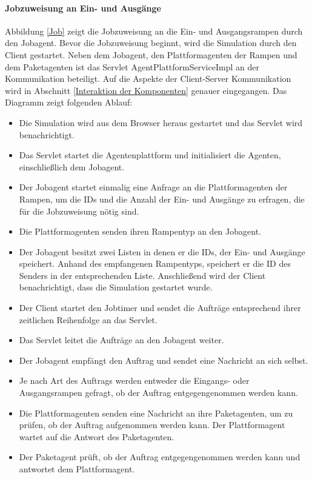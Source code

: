 \paragraph{Jobzuweisung an Ein- und Ausgänge} \label{Jobagent}
Abbildung \ref{Job} zeigt die Jobzuweisung an die Ein- und Ausgangsrampen durch den Jobagent. Bevor die Jobzuweisung beginnt, wird die Simulation durch den Client gestartet. Neben dem Jobagent, den Plattformagenten der Rampen und dem Paketagenten ist das Servlet AgentPlattformServiceImpl an der Kommunikation beteiligt. Auf die Aspekte der Client-Server Kommunikation wird in Abschnitt  \ref{Interaktion der Komponenten} genauer eingegangen. Das Diagramm zeigt folgenden Ablauf:
\begin{itemize}
\item Die Simulation wird aus dem Browser heraus gestartet und das Servlet wird benachrichtigt.
\item Das Servlet startet die Agentenplattform und initialisiert die Agenten, einschließlich dem Jobagent. 
\item Der Jobagent startet einmalig eine Anfrage an die Plattformagenten der Rampen, um die IDs und die Anzahl der Ein- und Ausgänge zu erfragen, die für die Jobzuweisung nötig sind. 
\item Die Plattformagenten senden ihren Rampentyp an den Jobagent.
\item Der Jobagent besitzt zwei Listen in denen er die IDs, der Ein- und Ausgänge speichert. Anhand des empfangenen Rampentyps, speichert er die ID des Senders in der entsprechenden Liste. Anschließend wird der Client benachrichtigt, dass die Simulation gestartet wurde.
\item Der Client startet den Jobtimer und sendet die Aufträge entsprechend ihrer zeitlichen Reihenfolge an das Servlet.
\item Das Servlet leitet die Aufträge an den Jobagent weiter.
\item Der Jobagent empfängt den Auftrag und sendet eine Nachricht an sich selbst.
\item Je nach Art des Auftrags werden entweder die Eingangs- oder Ausgangsrampen gefragt, ob der Auftrag entgegengenommen werden kann.
\item Die Plattformagenten senden eine Nachricht an ihre Paketagenten, um zu prüfen, ob der Auftrag aufgenommen werden kann. Der Plattformagent wartet auf die Antwort des Paketagenten.
\item Der Paketagent prüft, ob der Auftrag entgegengenommen werden kann und antwortet dem Plattformagent.

\end{itemize}
